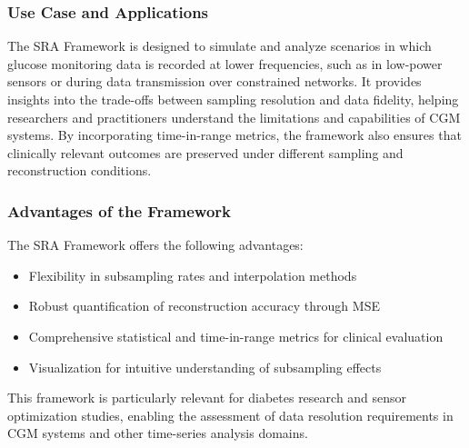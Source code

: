 \subsubsection{Use Case and Applications}
The SRA Framework is designed to simulate and analyze scenarios in which glucose monitoring data is recorded at lower frequencies, such as in low-power sensors or during data transmission over constrained networks. It provides insights into the trade-offs between sampling resolution and data fidelity, helping researchers and practitioners understand the limitations and capabilities of CGM systems. By incorporating time-in-range metrics, the framework also ensures that clinically relevant outcomes are preserved under different sampling and reconstruction conditions.

\subsubsection{Advantages of the Framework}
The SRA Framework offers the following advantages:
\begin{itemize}
	\item Flexibility in subsampling rates and interpolation methods
	\item Robust quantification of reconstruction accuracy through MSE
	\item Comprehensive statistical and time-in-range metrics for clinical evaluation
	\item Visualization for intuitive understanding of subsampling effects
\end{itemize}

This framework is particularly relevant for diabetes research and sensor optimization studies, enabling the assessment of data resolution requirements in CGM systems and other time-series analysis domains.



















